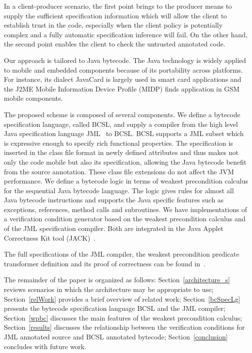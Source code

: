 In a client-producer scenario, the first point brings to the producer means to supply the sufficient specification information 
which will allow the client to establish trust in the code, especially when the client policy is potentially complex and a fully automatic specification inference
will fail. On the other hand, the second point enables the client to check the untrusted annotated code. 

  

Our approach is tailored to Java bytecode.
The Java technology is widely applied to mobile and embedded components because of its portability across platforms. 
For instance, its dialect JavaCard is largely used in smart card applications and the J2ME Mobile Information Device Profile 
(MIDP) finds application in GSM mobile components. 

The proposed scheme is composed of several components.
 We define a bytecode specification language, called BCSL, and supply a compiler from 
 the high level Java specification language JML~\cite{JMLRefMan} to BCSL. 
 BCSL supports a JML subset which is expressive enough to specify rich functional properties. 
The specification is inserted in the class file format in newly defined attributes and thus makes not
 only the code mobile but also its specification, allowing the Java bytecode benefit from the source annotation. These class
 file extensions do not affect the JVM performance.
We define a bytecode logic in terms of weakest precondition calculus for the sequential Java bytecode language. 
The logic gives rules for almost all Java bytecode instructions and supports the Java specific features such as
exceptions, references, method calls and subroutines.  
 We have implementations of a verification condition generator based on the weakest precondition calculus and of
 the JML specification compiler. Both are integrated in the Java Applet Correctness Kit tool (JACK)~\cite{BRL-JACK}.

 
 The full specifications of the JML compiler, the weakest precondition predicate transformer definition and its proof of correctness can be found in~\cite{JBL05MP}.
  
The remainder of the paper is organized as follows: 
Section~\ref{architecture_s} reviews scenarios in which the architecture may be appropriate to use; 
Section~\ref{relWork} provides a brief overview of related work;
 Section~\ref{bcSpecLg} presents the bytecode specification language BCSL and the JML compiler; Section~\ref{wpbc} discusses the main
features of the weakest precondition calculus; Section~\ref{results} discusses the relationship between the verification conditions for JML annotated source and BCSL annotated bytecode; Section~\ref{conclusion} concludes with future work.  















